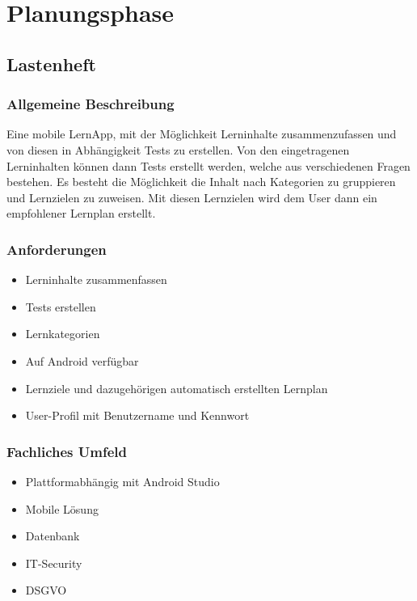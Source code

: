 \section{Planungsphase}
\label{Planung}

\subsection{Lastenheft}

\subsubsection{Allgemeine Beschreibung}
Eine mobile LernApp, mit der Möglichkeit Lerninhalte zusammenzufassen und von diesen in Abhängigkeit Tests zu erstellen.
Von den eingetragenen Lerninhalten können dann Tests erstellt werden, welche aus verschiedenen Fragen bestehen.
Es besteht die Möglichkeit die Inhalt nach Kategorien zu gruppieren und Lernzielen zu zuweisen.
Mit diesen Lernzielen wird dem User dann ein empfohlener Lernplan erstellt.

\subsubsection{Anforderungen}
\begin{itemize}
    \item Lerninhalte zusammenfassen
    \item Tests erstellen
    \item Lernkategorien
    \item Auf Android verfügbar
    \item Lernziele und dazugehörigen automatisch erstellten Lernplan
    \item User-Profil mit Benutzername und Kennwort
\end{itemize}

\subsubsection{Fachliches Umfeld}
\begin{itemize}
    \item Plattformabhängig mit Android Studio
    \item Mobile Lösung
    \item Datenbank
    \item IT-Security
    \item \ac{DSGVO}
\end{itemize}

